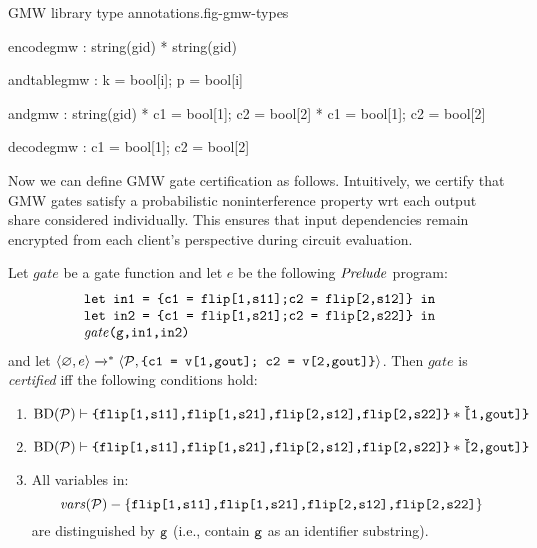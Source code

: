\begin{fpfig}[t]{GMW library type annotations.}{fig-gmw-types}
{\footnotesize
  \begin{verbatimtab}
   encodegmw   : string(gid) * string(gid)
    
   andtablegmw : { k = bool[i]; p = bool[i] }
    
   andgmw      : string(gid) *  { c1 = bool[1]; c2 = bool[2] } * { c1 = bool[1]; c2 = bool[2] }
    
   decodegmw   : { c1 = bool[1]; c2 = bool[2] }  \end{verbatimtab}
}
\end{fpfig}

Now we can define GMW gate certification as follows. Intuitively, we certify
that GMW gates satisfy a probabilistic noninterference property wrt each output
share considered individually. This ensures that input dependencies remain
encrypted from each client's perspective during circuit evaluation.
\begin{definition}
  \label{definition-gmwgate-certification}
  Let $\mathit{gate}$ be a gate function and let $e$ be the following
  $\mathit{Prelude}$ program:
  $$
  \begin{array}{l}
    \texttt{let in1 = \{c1 = flip[1,s11];c2 = flip[2,s12]\} in}\\
    \texttt{let in2 = \{c1 = flip[1,s21];c2 = flip[2,s22]\} in}\\
    \mathit{gate}\texttt{(g,in1,in2)}
  \end{array}
  $$
  and let $
  \langle \varnothing,e \rangle\xrightarrow{}^{*}\langle \mathcal{P},\texttt{\{c1 = v[1,gout]; c2 = v[2,gout]\}} \rangle
  $.
  Then $\mathit{gate}$ is \emph{certified} iff the following conditions hold:
  \begin{enumerate}[\hspace{5mm}i.]
  \item $\sep{\progtt(\prog)}{\ttt{\{flip[1,s11],flip[1,s21],flip[2,s12],flip[2,s22]\}}}{\ttt{\v[1,gout]\}}}$
  \item $\sep{\progtt(\prog)}{\ttt{\{flip[1,s11],flip[1,s21],flip[2,s12],flip[2,s22]\}}}{\ttt{\v[2,gout]\}}}$
  \item All variables in:$$\mathit{vars}(\mathcal{P}) - \{ \texttt{flip[1,s11],flip[1,s21],flip[2,s12],flip[2,s22]}\}$$
    are distinguished by $\texttt{g}$ (i.e., contain $\texttt{g}$ as an identifier substring). 
  \end{enumerate}
\end{definition}

